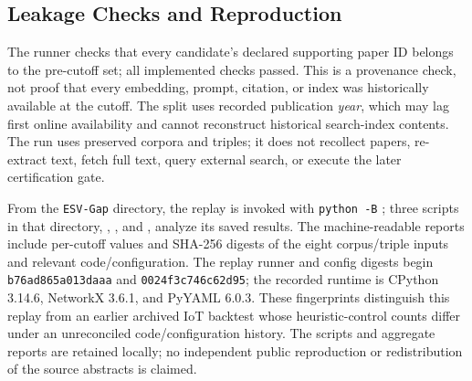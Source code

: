 \documentclass[conference,a4paper]{IEEEtran}
\begin{document}
\subsection{Leakage Checks and Reproduction}
The runner checks that every candidate's declared supporting paper ID belongs to the pre-cutoff set; all implemented checks passed. This is a provenance check, not proof that every embedding, prompt, citation, or index was historically available at the cutoff. The split uses recorded publication \emph{year}, which may lag first online availability and cannot reconstruct historical search-index contents. The run uses preserved corpora and triples; it does not recollect papers, re-extract text, fetch full text, query external search, or execute the later certification gate.

From the \texttt{ESV-Gap} directory, the replay is invoked with \texttt{python -B} ; three scripts in that directory, , , and , analyze its saved results. The machine-readable reports include per-cutoff values and SHA-256 digests of the eight corpus/triple inputs and relevant code/configuration. The replay runner and config digests begin \texttt{b76ad865a013daaa} and \texttt{0024f3c746c62d95}; the recorded runtime is CPython 3.14.6, NetworkX 3.6.1, and PyYAML 6.0.3. These fingerprints distinguish this replay from an earlier archived IoT backtest whose heuristic-control counts differ under an unreconciled code/configuration history. The scripts and aggregate reports are retained locally; no independent public reproduction or redistribution of the source abstracts is claimed.
\end{document}
